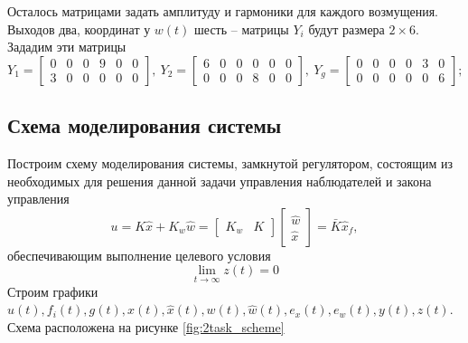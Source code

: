 \documentclass[a4paper, 12pt]{article}
\begin{document}
    Осталось матрицами задать амплитуду и гармоники для каждого возмущения. Выходов два,
    координат у $w(t)$ шесть -- матрицы $Y_i$ будут размера $2\times6$. Зададим эти матрицы
    $$
    Y_1=\begin{bmatrix}
        0 &0 &0 &9 &0 &0\\
        3 &0 &0 &0 &0 &0
    \end{bmatrix},\ Y_2=\begin{bmatrix}
        6 &0 &0 &0 &0 &0\\
        0 &0 &0 &8 &0 &0
    \end{bmatrix},\ Y_g=\begin{bmatrix}
        0 &0 &0 &0 &3 &0\\
        0 &0 &0 &0 &0 &6
    \end{bmatrix};
    $$

    
    \subsection{Схема моделирования системы}
    Построим схему моделирования системы, замкнутой регулятором,
    состоящим из необходимых для решения данной задачи управления наблюдателей и закона
    управления $$u=K\hat{x}+K_w\hat{w}=\begin{bmatrix}K_w &K\end{bmatrix}\begin{bmatrix}
        \hat{w}\\ \hat{x}
    \end{bmatrix}=\bar{K}\hat{x}_f,$$ обеспечивающим выполнение целевого условия $$\lim\limits_{t\to\infty}z(t)=0$$ 
    Строим графики $u(t),f_i(t),g(t),x(t),\hat{x}(t),w(t),\hat{w}(t),e_x(t),e_w(t),y(t),z(t)$.
    Схема расположена на рисунке \ref{fig:2task_scheme}
\end{document}
